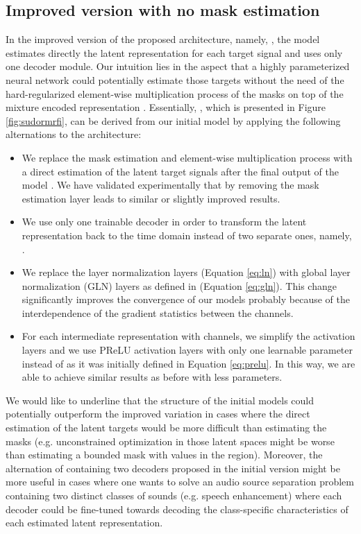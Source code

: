 \subsection{Improved version with no mask estimation \sudoi}
\label{sec:net_arch:sudoi}
In the improved version of the proposed architecture, namely, \sudoi, the model estimates directly the latent representation for each target signal  and uses only one decoder module. Our intuition lies in the aspect that a highly parameterized neural network could potentially estimate those targets without the need of the hard-regularized element-wise multiplication process of the masks on top of the mixture encoded representation . Essentially, \sudodoti, which is presented in Figure \ref{fig:sudormrfi}, can be derived from our initial \sudodot model by applying the following alternations to the architecture:
\begin{itemize}
\item We replace the mask estimation and element-wise multiplication process with a direct estimation of the latent target signals  after the final output of the model . We have validated experimentally that by removing the mask estimation layer leads to similar or slightly improved results.
\item We use only one trainable decoder in order to transform the latent representation back to the time domain instead of two separate ones, namely, .
\item We replace the layer normalization layers (Equation \ref{eq:ln}) with global layer normalization (GLN) layers as defined in (Equation \ref{eq:gln}). This change significantly improves the convergence of our models probably because of the interdependence of the gradient statistics between the channels.
\item For each intermediate representation with  channels, we simplify the activation layers and we use PReLU activation layers with only one learnable parameter instead of  as it was initially defined in Equation \ref{eq:prelu}. In this way, we are able to achieve similar results as before with less parameters.
\end{itemize}
We would like to underline that the structure of the initial \sudo models could potentially outperform the improved \sudoi variation in cases where the direct estimation of the latent targets would be more difficult than estimating the masks (e.g. unconstrained optimization in those latent spaces might be worse than estimating a bounded mask with values in the  region). Moreover, the alternation of containing two decoders proposed in the initial version might be more useful in cases where one wants to solve an audio source separation problem containing two distinct classes of sounds (e.g. speech enhancement) where each decoder could be fine-tuned towards decoding the class-specific characteristics of each estimated latent representation.

